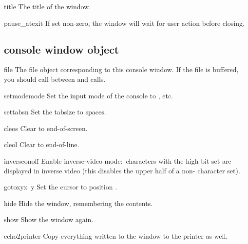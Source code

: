 \begin{datadesc}{title}
The title of the window.
\end{datadesc}

\begin{datadesc}{pause_atexit}
If set non-zero, the window will wait for user action before closing.
\end{datadesc}

\subsection{console window object}


\begin{datadesc}{file}
The file object corresponding to this console window. If the file is
buffered, you should call  between
 and  calls.
\end{datadesc}


\begin{funcdesc}{setmode}{mode}
Set the input mode of the console to , etc.
\end{funcdesc}

\begin{funcdesc}{settabs}{n}
Set the tabsize to  spaces.
\end{funcdesc}

\begin{funcdesc}{cleos}{}
Clear to end-of-screen.
\end{funcdesc}

\begin{funcdesc}{cleol}{}
Clear to end-of-line.
\end{funcdesc}

\begin{funcdesc}{inverse}{onoff}
Enable inverse-video mode:\ characters with the high bit set are
displayed in inverse video (this disables the upper half of a
non-\ASCII{} character set).
\end{funcdesc}

\begin{funcdesc}{gotoxy}{x\, y}
Set the cursor to position .
\end{funcdesc}

\begin{funcdesc}{hide}{}
Hide the window, remembering the contents.
\end{funcdesc}

\begin{funcdesc}{show}{}
Show the window again.
\end{funcdesc}

\begin{funcdesc}{echo2printer}{}
Copy everything written to the window to the printer as well.
\end{funcdesc}
